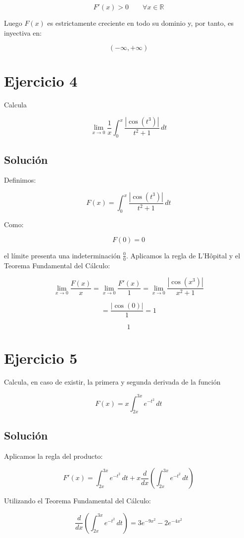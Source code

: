 \documentclass[fleqn]{article}
\begin{document}
	\[
	F'(x)>0
	\qquad
	\forall x\in\mathbb{R}
	\]

	Luego $F(x)$ es estrictamente creciente en todo su dominio y, por tanto, es inyectiva en:

	\[
	\boxed{(-\infty,+\infty)}
	\]

\section{Ejercicio 4}
	Calcula

	\[
	\lim_{x\to 0}
	\frac{1}{x}
	\int_0^x
	\frac{|\cos(t^3)|}{t^2+1}\,dt
	\]

	\subsection{Solución}

	Definimos:

	\[
	F(x)
	=
	\int_0^x
	\frac{|\cos(t^3)|}{t^2+1}\,dt
	\]

	Como:

	\[
	F(0)=0
	\]

	el límite presenta una indeterminación $\frac{0}{0}$. Aplicamos la regla de L'Hôpital y el Teorema Fundamental del Cálculo:

	\[
	\lim_{x\to 0}
	\frac{F(x)}{x}
	=
	\lim_{x\to 0}
	\frac{F'(x)}{1}
	=
	\lim_{x\to 0}
	\frac{|\cos(x^3)|}{x^2+1}
	\]

	\[
	=
	\frac{|\cos(0)|}{1}
	=
	1
	\]

	\[
	\boxed{1}
	\]

\section{Ejercicio 5}
	Calcula, en caso de existir, la primera y segunda derivada de la función

	\[
	F(x)=x\int_{2x}^{3x}e^{-t^2}\,dt
	\]

	\subsection{Solución}

	Aplicamos la regla del producto:

	\[
	F'(x)
	=
	\int_{2x}^{3x}e^{-t^2}\,dt
	+
	x\frac{d}{dx}
	\left(
	\int_{2x}^{3x}e^{-t^2}\,dt
	\right)
	\]

	Utilizando el Teorema Fundamental del Cálculo:

	\[
	\frac{d}{dx}
	\left(
	\int_{2x}^{3x}e^{-t^2}\,dt
	\right)
	=
	3e^{-9x^2}
	-
	2e^{-4x^2}
	\]
\end{document}
